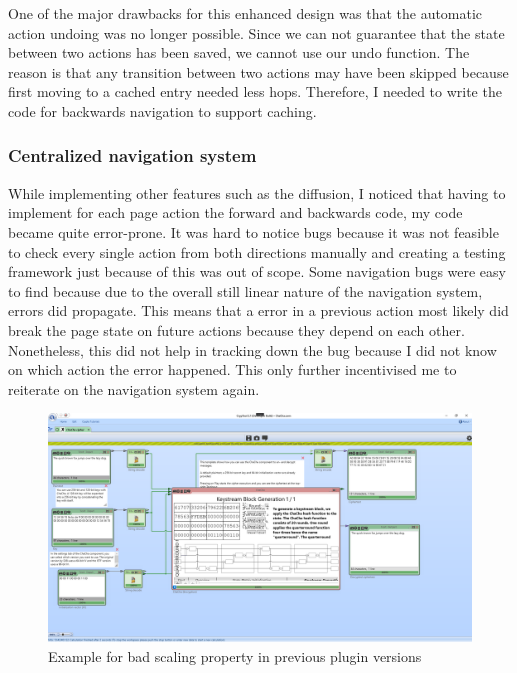 One of the major drawbacks for this enhanced design was that the automatic action undoing was no longer possible. Since we can not guarantee that the state between two actions has been saved, we cannot use our undo function. The reason is that any transition between two actions may have been skipped because first moving to a cached entry needed less hops. Therefore, I needed to write the code for backwards navigation to support caching.

\subsubsection{Centralized navigation system}

While implementing other features such as the diffusion, I noticed that having to implement for each page action the forward and backwards code, my code became quite error-prone. It was hard to notice bugs because it was not feasible to check every single action from both directions manually and creating a testing framework just because of this was out of scope. Some navigation bugs were easy to find because due to the overall still linear nature of the navigation system, errors did propagate. This means that a error in a previous action most likely did break the page state on future actions because they depend on each other. Nonetheless, this did not help in tracking down the bug because I did not know on which action the error happened. This only further incentivised me to reiterate on the navigation system again.

\begin{figure}
\caption{Example for bad scaling property in previous plugin versions}
\label{plugin.scaling.bug}
\includegraphics[width=\textwidth]{figures/scaling-bug-example.png}
\end{figure}

